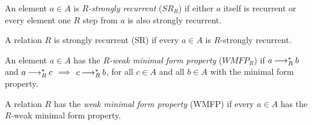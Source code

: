 \begin{definition}
    An element $a \in A$ is \emph{$R$-strongly recurrent} ($SR_R$) if either $a$ itself is recurrent or every element one $R$ step
    from $a$ is also strongly recurrent.
  
    A relation $R$ is strongly recurrent (SR) if every
    $a \in A$ is $R$-strongly recurrent.
\end{definition}

\begin{definition}
   An element $a \in A$ has the \emph{${R}$-weak minimal form property} ($WMFP_R$) if
   $a \mathbin{\longrightarrow_R^*} b$ and $a \mathbin{\longrightarrow_R^*} c$  $\implies$
   $c \mathbin{\longrightarrow_R^*} b$, for all $c \in A$ and all $b \in A$ with the minimal form property.

   A relation $R$ has the \emph{weak minimal form property} (WMFP) if every $a \in A$ has the $R$-weak minimal form property.
\end{definition}









